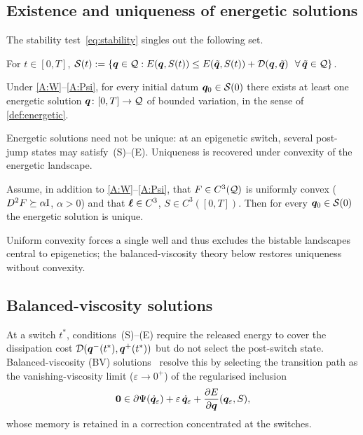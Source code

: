 \subsection{Existence and uniqueness of energetic solutions}
\label{sec:existence}

The stability test~\eqref{eq:stability} singles out the following set.

\begin{definition}\label{def:stability_set}
For $t\in[0,T]$, $\mathcal S(t):=\{\bm{q}\in\mathcal{Q}: E(\bm{q},S(t))\le
E(\tilde{\bm{q}},S(t))+\mathcal{D}(\bm{q},\tilde{\bm{q}})\ \ \forall\,\tilde{\bm{q}}\in\mathcal{Q}\}$.
\end{definition}

\begin{theorem}[Existence]\label{thm:existence}
Under \ref{A:W}--\ref{A:Psi}, for every initial datum
$\bm{q}_0\in\mathcal S(0)$ there exists at least one energetic solution
$\bm{q}\colon[0,T]\to\mathcal{Q}$ of bounded variation, in the sense of
\cref{def:energetic}.
\end{theorem}

Energetic solutions need not be unique: at an epigenetic switch,
several post-jump states may satisfy~(S)--(E). Uniqueness is recovered
under convexity of the energetic landscape.

\begin{theorem}\label{thm:uniqueness}
Assume, in addition to \ref{A:W}--\ref{A:Psi}, that $F\in C^3(\mathcal{Q})$ is
uniformly convex ($D^2F\succeq\alpha\mathrm{I}$, $\alpha>0$) and that
$\bm{\ell}\in C^3$, $S\in C^3([0,T])$. Then for every
$\bm{q}_0\in\mathcal S(0)$ the energetic solution is unique.
\end{theorem}

Uniform convexity forces a single well and thus excludes the bistable
landscapes central to epigenetics; the balanced-viscosity theory below
restores uniqueness without convexity.

\subsection{Balanced-viscosity solutions}\label{sec:bv}

At a switch $t^\ast$, conditions~(S)--(E) require the released energy to
cover the dissipation cost $\mathcal{D}(\bm{q}^-(t^\ast),\bm{q}^+(t^\ast))$ but do
not select the post-switch state. Balanced-viscosity (BV)
solutions~\cite{mielke2012bv} resolve this by selecting the transition
path as the vanishing-viscosity limit ($\varepsilon\to0^+$) of the
regularised inclusion
\begin{equation}\label{eq:regularised}
  \bm{0}\in\partial\Psi(\dot{\bm{q}}_\varepsilon)
  +\varepsilon\,\dot{\bm{q}}_\varepsilon
  +\frac{\partial E}{\partial\bm{q}}(\bm{q}_\varepsilon,S),
\end{equation}
whose memory is retained in a correction concentrated at the switches.

